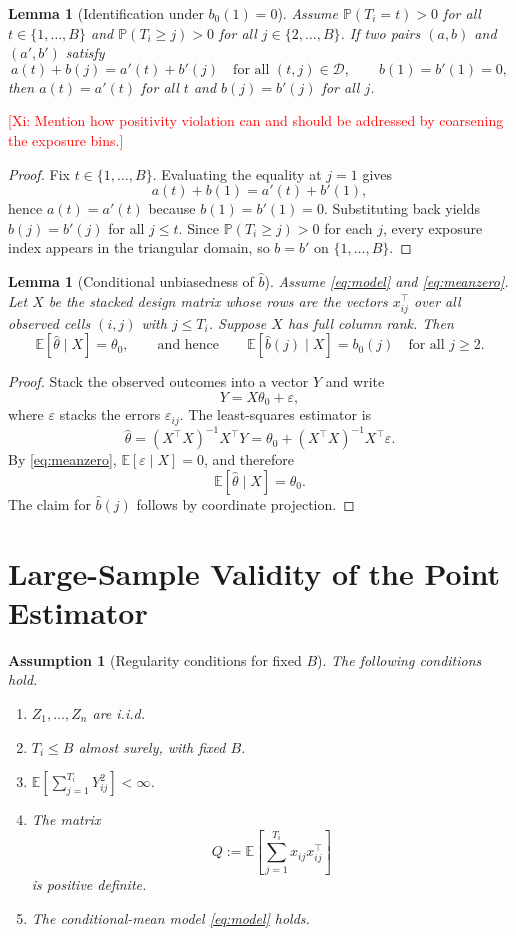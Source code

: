 \documentclass[sigconf,anonymous,review]{acmart}
\newtheorem{lemma}[theorem]{Lemma}
\newtheorem{assumption}[theorem]{Assumption}
\newcommand{\xg}[1]{\textcolor{red}{[Xi: #1]}}
\begin{document}
\begin{lemma}[Identification under $b_0(1)=0$]
\label{lem:ident}
Assume $\mathbb{P}(T_i=t)>0$ for all $t\in\{1,\dots,B\}$ and $\mathbb{P}(T_i\ge j)>0$ for all $j\in\{2,\dots,B\}$. If two pairs $(a,b)$ and $(a',b')$ satisfy
\[
a(t)+b(j)=a'(t)+b'(j)
\quad\text{for all } (t,j)\in\mathcal{D},
\qquad b(1)=b'(1)=0,
\]
then $a(t)=a'(t)$ for all $t$ and $b(j)=b'(j)$ for all $j$.
\end{lemma}

\xg{Mention how positivity violation can and should be addressed by coarsening the exposure bins.}

\begin{proof}
Fix $t\in\{1,\dots,B\}$. Evaluating the equality at $j=1$ gives
\[
a(t)+b(1)=a'(t)+b'(1),
\]
hence $a(t)=a'(t)$ because $b(1)=b'(1)=0$. Substituting back yields $b(j)=b'(j)$ for all $j\le t$. Since $\mathbb{P}(T_i\ge j)>0$ for each $j$, every exposure index appears in the triangular domain, so $b=b'$ on $\{1,\dots,B\}$.
\end{proof}

\begin{lemma}[Conditional unbiasedness of $\hat b$]
\label{lem:unbiased}
Assume \eqref{eq:model} and \eqref{eq:meanzero}. Let $X$ be the stacked design matrix whose rows are the vectors $x_{ij}^\top$ over all observed cells $(i,j)$ with $j\le T_i$. Suppose $X$ has full column rank. Then
\[
\mathbb{E}[\hat\theta\mid X]=\theta_0,
\qquad\text{and hence}\qquad
\mathbb{E}[\hat b(j)\mid X]=b_0(j)\quad\text{for all } j\ge 2.
\]
\end{lemma}

\begin{proof}
Stack the observed outcomes into a vector $Y$ and write
\[
Y=X\theta_0+\varepsilon,
\]
where $\varepsilon$ stacks the errors $\varepsilon_{ij}$. The least-squares estimator is
\[
\hat\theta=(X^\top X)^{-1}X^\top Y
=
\theta_0+(X^\top X)^{-1}X^\top\varepsilon.
\]
By \eqref{eq:meanzero}, $\mathbb{E}[\varepsilon\mid X]=0$, and therefore
\[
\mathbb{E}[\hat\theta\mid X]=\theta_0.
\]
The claim for $\hat b(j)$ follows by coordinate projection.
\end{proof}

\section{Large-Sample Validity of the Point Estimator}

\begin{assumption}[Regularity conditions for fixed $B$]
\label{ass:reg}
The following conditions hold.
\begin{enumerate}
\item $Z_1,\dots,Z_n$ are i.i.d.
\item $T_i\le B$ almost surely, with fixed $B$.
\item $\mathbb{E}\!\left[\sum_{j=1}^{T_i} Y_{ij}^2\right]<\infty$.
\item The matrix
\[
Q:=\mathbb{E}\!\left[\sum_{j=1}^{T_i} x_{ij}x_{ij}^\top\right]
\]
is positive definite.
\item The conditional-mean model \eqref{eq:model} holds.
\end{enumerate}
\end{assumption}
\end{document}
